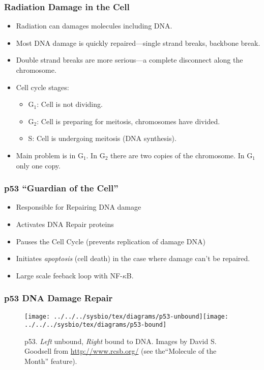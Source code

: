 \begin{frame}
  \frametitle{Radiation Damage in the Cell}
  \begin{itemize}
  \item Radiation can damages molecules including DNA.
  \item Most DNA damage is quickly repaired---single strand breaks,
    backbone break.
  \item Double strand breaks are more serious---a complete disconnect along
    the chromosome.
  \item Cell cycle stages: 
    
    \begin{itemize}
    \item $\text{G}_{1}$: Cell is not dividing.
    \item $\text{G}_{2}$: Cell is preparing for meitosis, chromosomes have
      divided.
    \item S: Cell is undergoing meitosis (DNA synthesis).
    \end{itemize}
  \item Main problem is in $\text{G}_1$. In $\text{G}_2$ there are two
    copies of the chromosome.  In $\text{G}_1$ only one copy.
  \end{itemize}
\end{frame}


\begin{frame}
  \frametitle{p53 ``Guardian of the Cell''}
  \begin{itemize}
  \item Responsible for Repairing DNA damage
  \item Activates DNA Repair proteins
  \item Pauses the Cell Cycle (prevents replication of damage DNA)
  \item Initiates \emph{apoptosis} (cell death) in the case where damage can't
    be repaired.
  \item Large scale feeback loop with NF-$\kappa$B.
  \end{itemize}

\end{frame}


\begin{frame}
  \frametitle{p53 DNA Damage Repair}

  \begin{figure}
    \texttt{[image: ../../../sysbio/tex/diagrams/p53-unbound]}\hfill\texttt{[image: ../../../sysbio/tex/diagrams/p53-bound]}

    \caption{p53. \emph{Left} unbound, \emph{Right }bound to DNA. Images by David
      S. Goodsell from \protect\url{http://www.rcsb.org/} (see the``Molecule
      of the Month'' feature).}

  \end{figure}
\end{frame}


